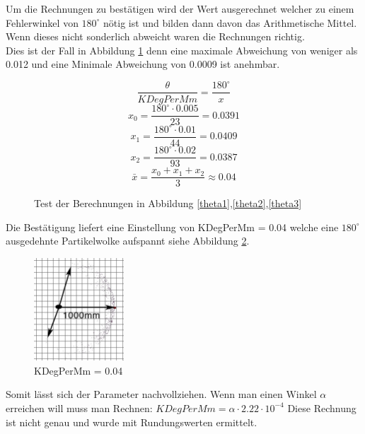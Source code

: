 \documentclass{article}
\begin{document}
Um die Rechnungen zu best\"atigen wird der Wert ausgerechnet welcher zu einem Fehlerwinkel von $180^\circ$ n\"otig ist und bilden dann davon das Arithmetische Mittel. Wenn dieses nicht sonderlich abweicht waren die Rechnungen richtig. \\ Dies ist der Fall in Abbildung \ref{testCalacAll} denn eine maximale Abweichung von weniger als 0.012 und eine Minimale Abweichung von 0.0009 ist anehmbar. 

\begin{figure}
	\begin{equation}\label{get0005Y}	
		\frac{\theta}{KDegPerMm}=\frac{180^\circ}{x}
	\end{equation}
	\begin{equation}\label{get0005Y}	
		{x_0}=\frac{180^\circ \cdot 0.005}{23}=0.0391
	\end{equation}
	\begin{equation}\label{get0005Y}	
		{x_1}=\frac{180^\circ \cdot 0.01}{44}=0.0409
	\end{equation}
	\begin{equation}\label{get0005Y}	
		{x_2}=\frac{180^\circ \cdot 0.02}{93}=0.0387
	\end{equation}
	\begin{equation}\label{get0005Y}
		\bar{x}=\frac{x_0+x_1+x_2}{3} \approx 0.04
	\end{equation}
  \caption{Test der Berechnungen in Abbildung \ref{theta1},\ref{theta2},\ref{theta3}}
  \label{testCalacAll}
\end{figure}

Die Best\"atigung liefert eine Einstellung von KDegPerMm = 0.04 welche eine $180^\circ$ ausgedehnte Partikelwolke aufspannt siehe Abbildung \ref{KDegPerMm004Test}.

\begin{figure}
	\centering
	\includegraphics[width=0.3\textwidth]{img/KDegPerMm004.jpg}
	\caption{KDegPerMm = 0.04}
	  \label{KDegPerMm004Test}
\end{figure}

Somit l\"asst sich der Parameter nachvollziehen. Wenn man einen Winkel $\alpha$ erreichen will muss man Rechnen: $KDegPerMm = \alpha \cdot 2.22 \cdot 10^{-4}$
Diese Rechnung ist nicht genau und wurde mit Rundungswerten ermittelt. 
\newpage
\end{document}
